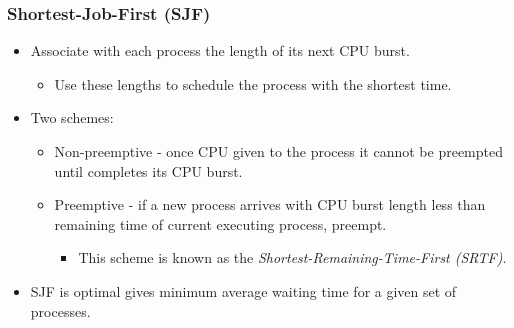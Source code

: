 \documentclass[CJKutf8,xcolor=pdftex,dvipsnames,table]{beamer}
\begin{document}
\begin{CJK*}{UTF8}{song}
  \begin{frame}
  \frametitle{Shortest-Job-First (SJF)} \pause
  \begin{itemize}
  \item{Associate with each process the length of its next CPU burst.} \pause
    \begin{itemize}
    \item{Use these lengths to schedule the process with the shortest time.} \pause
    \end{itemize}
  \item{Two schemes:} \pause
    \begin{itemize}
    \item{Non-preemptive \pause - once CPU given to the process it cannot be preempted until completes its CPU burst.} \pause
    \item{Preemptive \pause - if a new process arrives with CPU burst length less than remaining time of current executing process, preempt.} \pause
      \begin{itemize}
      \item{This scheme is known as the \emph{Shortest-Remaining-Time-First (SRTF)}.} \pause
      \end{itemize}
    \end{itemize}
  \item{SJF is optimal gives minimum average waiting time for a given set of processes.}
  \end{itemize}
  \end{frame}
  

\end{CJK*}
\end{document}
